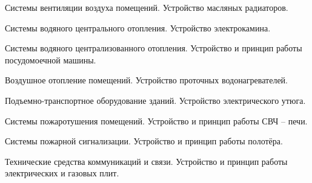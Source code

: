 \documentclass[
	14pt,
	a4paper,
	]
	{scrartcl}
\begin{document}
\vfill

\newpage


\shapk
{}
\setcounter{zad}{0}

\vfill
\z Системы вентиляции воздуха помещений.
 \vfill
\z Устройство масляных радиаторов.
 \vfill

\vfill

\newpage


\shapk
{}
\setcounter{zad}{0}

\vfill
\z Системы водяного центрального отопления.
 \vfill
\z Устройство электрокамина.
 \vfill

\vfill

\newpage


\shapk
{}
\setcounter{zad}{0}

\vfill
\z Системы водяного централизованного отопления.
 \vfill
\z Устройство и принцип работы посудомоечной машины.
 \vfill

\vfill

\newpage


\shapk
{}
\setcounter{zad}{0}

\vfill
\z Воздушное отопление помещений.
 \vfill
\z Устройство проточных водонагревателей.
 \vfill

\vfill

\newpage


\shapk
{}
\setcounter{zad}{0}

\vfill
\z Подъемно-транспортное оборудование зданий.
 \vfill
\z Устройство электрического утюга.
 \vfill

\vfill

\newpage


\shapk
{}
\setcounter{zad}{0}

\vfill
\z Системы пожаротушения помещений.
 \vfill
\z Устройство и принцип работы СВЧ – печи.
 \vfill

\vfill

\newpage


\shapk
{}
\setcounter{zad}{0}

\vfill
\z Системы пожарной сигнализации.
 \vfill
\z Устройство и принцип работы полотёра.
 \vfill

\vfill

\newpage


\shapk
{}
\setcounter{zad}{0}

\vfill
\z Технические средства коммуникаций и связи.
 \vfill
\z Устройство и принцип работы электрических и газовых плит.
 \vfill
\end{document}
